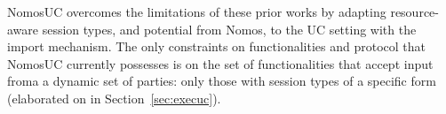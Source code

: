 NomosUC overcomes the limitations of these prior works by adapting resource-aware session types, and potential from Nomos, to the UC setting with the import mechanism. 
The only constraints on functionalities and protocol that NomosUC currently possesses is on the set of functionalities that accept input froma a dynamic set of parties: only those with session types of a specific form (elaborated on in Section~\ref{sec:execuc}).

%
%
%

